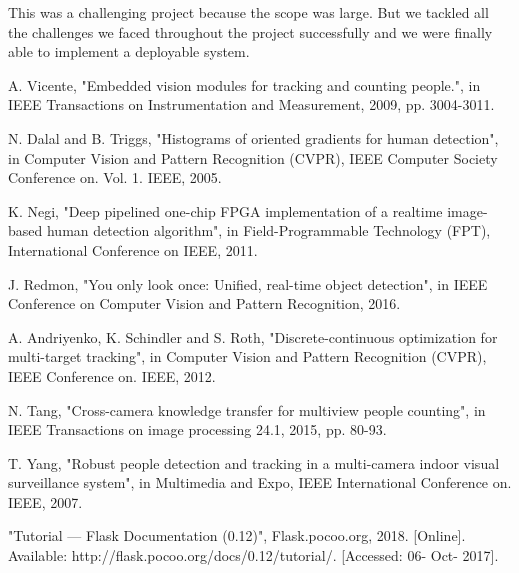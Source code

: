 \documentclass[12pt,a4paper]{report}
\begin{document}
\par This was a challenging project because the scope was large. But we tackled all the challenges we faced throughout the project successfully and we were finally able to implement a deployable system. 




\newpage
\begin{thebibliography}{10}






A. Vicente, "Embedded vision modules for tracking and counting people.", in IEEE Transactions on Instrumentation and Measurement, 2009, pp. 3004-3011.

N. Dalal and B. Triggs, "Histograms of oriented gradients for human detection", in Computer Vision and Pattern Recognition (CVPR), IEEE Computer Society Conference on. Vol. 1. IEEE, 2005.

K. Negi, "Deep pipelined one-chip FPGA implementation of a realtime image-based human detection algorithm", in Field-Programmable Technology (FPT), International Conference on IEEE, 2011.

J. Redmon, "You only look once: Unified, real-time object detection", in IEEE Conference on Computer Vision and Pattern Recognition, 2016.

A. Andriyenko, K. Schindler and S. Roth, "Discrete-continuous optimization for multi-target tracking", in Computer Vision and Pattern Recognition (CVPR), IEEE Conference on. IEEE, 2012.

N. Tang, "Cross-camera knowledge transfer for multiview people counting", in IEEE Transactions on image processing 24.1, 2015, pp. 80-93.

T. Yang, "Robust people detection and tracking in a multi-camera indoor visual surveillance system", in Multimedia and Expo, IEEE International Conference on. IEEE, 2007.

"Tutorial — Flask Documentation (0.12)", Flask.pocoo.org, 2018. [Online]. Available: http://flask.pocoo.org/docs/0.12/tutorial/. [Accessed: 06- Oct- 2017].


\end{thebibliography}
\end{document}
